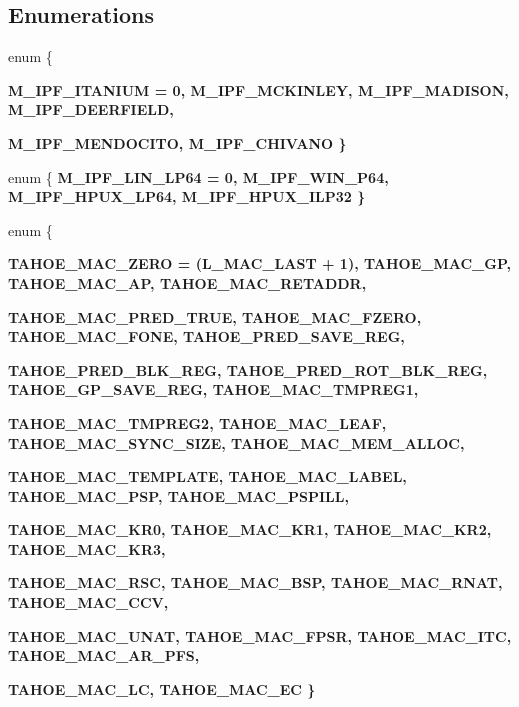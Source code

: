 \subsection*{Enumerations}
\begin{CompactItemize}
\item 
enum \{ \par
\bf{M\_\-IPF\_\-ITANIUM} =  0, 
\bf{M\_\-IPF\_\-MCKINLEY}, 
\bf{M\_\-IPF\_\-MADISON}, 
\bf{M\_\-IPF\_\-DEERFIELD}, 
\par
\bf{M\_\-IPF\_\-MENDOCITO}, 
\bf{M\_\-IPF\_\-CHIVANO}
 \}
\item 
enum \{ \bf{M\_\-IPF\_\-LIN\_\-LP64} =  0, 
\bf{M\_\-IPF\_\-WIN\_\-P64}, 
\bf{M\_\-IPF\_\-HPUX\_\-LP64}, 
\bf{M\_\-IPF\_\-HPUX\_\-ILP32}
 \}
\item 
enum \{ \par
\bf{TAHOE\_\-MAC\_\-ZERO} =  (L\_\-MAC\_\-LAST + 1), 
\bf{TAHOE\_\-MAC\_\-GP}, 
\bf{TAHOE\_\-MAC\_\-AP}, 
\bf{TAHOE\_\-MAC\_\-RETADDR}, 
\par
\bf{TAHOE\_\-MAC\_\-PRED\_\-TRUE}, 
\bf{TAHOE\_\-MAC\_\-FZERO}, 
\bf{TAHOE\_\-MAC\_\-FONE}, 
\bf{TAHOE\_\-PRED\_\-SAVE\_\-REG}, 
\par
\bf{TAHOE\_\-PRED\_\-BLK\_\-REG}, 
\bf{TAHOE\_\-PRED\_\-ROT\_\-BLK\_\-REG}, 
\bf{TAHOE\_\-GP\_\-SAVE\_\-REG}, 
\bf{TAHOE\_\-MAC\_\-TMPREG1}, 
\par
\bf{TAHOE\_\-MAC\_\-TMPREG2}, 
\bf{TAHOE\_\-MAC\_\-LEAF}, 
\bf{TAHOE\_\-MAC\_\-SYNC\_\-SIZE}, 
\bf{TAHOE\_\-MAC\_\-MEM\_\-ALLOC}, 
\par
\bf{TAHOE\_\-MAC\_\-TEMPLATE}, 
\bf{TAHOE\_\-MAC\_\-LABEL}, 
\bf{TAHOE\_\-MAC\_\-PSP}, 
\bf{TAHOE\_\-MAC\_\-PSPILL}, 
\par
\bf{TAHOE\_\-MAC\_\-KR0}, 
\bf{TAHOE\_\-MAC\_\-KR1}, 
\bf{TAHOE\_\-MAC\_\-KR2}, 
\bf{TAHOE\_\-MAC\_\-KR3}, 
\par
\bf{TAHOE\_\-MAC\_\-RSC}, 
\bf{TAHOE\_\-MAC\_\-BSP}, 
\bf{TAHOE\_\-MAC\_\-RNAT}, 
\bf{TAHOE\_\-MAC\_\-CCV}, 
\par
\bf{TAHOE\_\-MAC\_\-UNAT}, 
\bf{TAHOE\_\-MAC\_\-FPSR}, 
\bf{TAHOE\_\-MAC\_\-ITC}, 
\bf{TAHOE\_\-MAC\_\-AR\_\-PFS}, 
\par
\bf{TAHOE\_\-MAC\_\-LC}, 
\bf{TAHOE\_\-MAC\_\-EC}
 \}
\end{CompactItemize}
